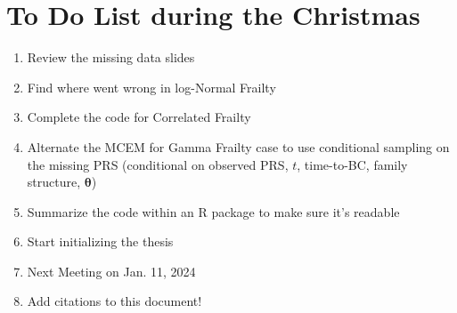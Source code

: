 \documentclass[preprint,12pt]{elsarticle}
\begin{document}
\begin{frontmatter}





\end{frontmatter}

\linenumbers
\section{To Do List during the Christmas}
\begin{enumerate}
    \item Review the missing data slides
    \item Find where went wrong in log-Normal Frailty
    \item Complete the code for Correlated Frailty
    \item Alternate the MCEM for Gamma Frailty case to use conditional sampling on the missing PRS (conditional on observed PRS, $t$, time-to-BC, family structure, $\boldsymbol{\theta}$)
    \item Summarize the code within an R package to make sure it's readable
    \item Start initializing the thesis
    \item Next Meeting on Jan. 11, 2024
    \item Add citations to this document!
\end{enumerate}
\end{document}
